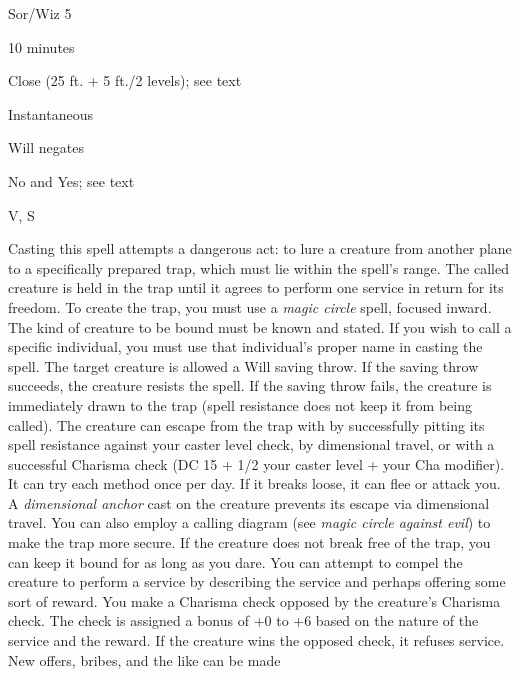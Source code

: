 
\begin{description*}
\item[Level:] Sor/Wiz 5
\item[Casting Time:] 10 minutes
\item[Range:] Close (25 ft. + 5 ft./2 levels); see text
\item[Duration:] Instantaneous
\item[Saving Throw:] Will negates
\item[Spell Resistance:] No and Yes; see text
\item[Components:] V, S
\end{description*}

Casting this spell attempts a dangerous act: to lure a creature from another plane
to a specifically prepared trap, which must lie within the spell's range. The called
creature is held in the trap until it agrees to perform one service in return for
its freedom.
To create the trap, you must use a \textit{magic circle} spell, focused inward.
The kind of creature to be bound must be known and stated. If you wish to call
a specific individual, you must use that individual's proper name in casting the
spell.
The target creature is allowed a Will saving throw. If the saving throw succeeds,
the creature resists the spell. If the saving throw fails, the creature is immediately
drawn to the trap (spell resistance does not keep it from being called). The creature
can escape from the trap with by successfully pitting its spell resistance against
your caster level check, by dimensional travel, or with a successful Charisma check
(DC 15 + 1/2 your caster level + your Cha modifier). It can try each method once
per day. If it breaks loose, it can flee or attack you. A \textit{dimensional anchor
}cast on the creature prevents its escape via dimensional travel. You can also
employ a calling diagram (see \textit{magic circle against evil}) to make the trap
more secure.
If the creature does not break free of the trap, you can keep it bound for as long
as you dare. You can attempt to compel the creature to perform a service by describing
the service and perhaps offering some sort of reward. You make a Charisma check
opposed by the creature's Charisma check. The check is assigned a bonus of +0 to
+6 based on the nature of the service and the reward. If the creature wins the
opposed check, it refuses service. New offers, bribes, and the like can be made
